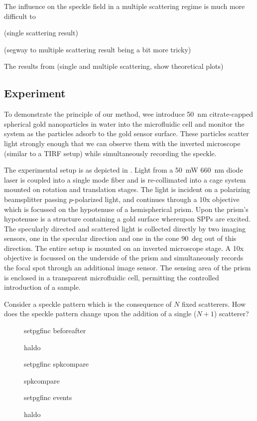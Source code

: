 The influence on the speckle field in a multiple scattering regime is much
more difficult to 

(single scattering result)

(segway to multiple scattering result being a bit more tricky)


The results from (single and multiple scattering, show theoretical plots)



\subsection{Experiment}
To demonstrate the principle of our method, wee introduce
\SI{50}{\nano\meter} citrate-capped spherical gold nanoparticles in water
into the microfluidic cell and monitor the system as the particles adsorb
to the gold sensor surface.  These particles scatter light strongly enough
that we can observe them with the inverted microscope (similar to a TIRF
setup) while simultaneously recording the speckle. 

The experimental setup is as depicted in .  Light from
a \SI{50}{\milli\watt} \SI{660}{\nano\meter} diode laser is coupled into a
single mode fiber and is re-collimated into a cage system mounted on
rotation and translation stages.  The light is incident on a polarizing
beamsplitter passing $p$-polarized light, and continues through a 10x
objective which is focussed on the hypotenuse of a hemispherical prism.
Upon the prism's hypotenuse is a structure containing a gold surface
whereupon SPPs are excited.  The specularly directed and scattered light is
collected directly by two imaging sensors, one in the specular direction
and one in the cone \SI{90}{deg} out of this direction.  The entire setup
is mounted on an inverted microscope stage.  A 10x objective is focussed on
the underside of the prism and simultaneously records the focal spot
through an additional image sensor.  The sensing area of the prism is
enclosed in a transparent microfluidic cell, permitting the controlled
introduction of a sample.


Consider a speckle pattern which is the consequence of $N$ fixed
scatterers.  How does the speckle pattern change upon the addition of a
single ($N+1$) scatterer?  

\begin{figure}
\centering
{setpgfinc}
{beforeafter}
\caption{haldo}
\label{fig:scattbeforeafter}
\end{figure}

\begin{figure}
\centering
{setpgfinc}
{spkcompare}
\caption{spkcompare}
\label{fig:scattspkcompare}
\end{figure}

\begin{figure}
\centering
{setpgfinc}
{events}
\caption{haldo}
\label{fig:scattbeforeafter}
\end{figure}

